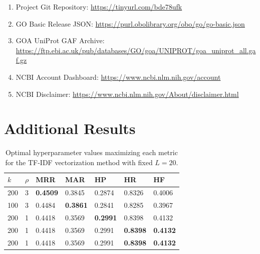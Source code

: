 \documentclass[11pt]{article}
\theoremstyle{plain}
\theoremstyle{definition}
\begin{document}
\begin{enumerate}
    \item Project Git Repository: \url{https://tinyurl.com/bde78ufk}
    \item GO Basic Release JSON\@: \url{https://purl.obolibrary.org/obo/go/go-basic.json}
    \item GOA UniProt GAF Archive: \url{https://ftp.ebi.ac.uk/pub/databases/GO/goa/UNIPROT/goa_uniprot_all.gaf.gz}
    \item NCBI Account Dashboard: \url{https://www.ncbi.nlm.nih.gov/account}
    \item NCBI Disclaimer: \url{https://www.ncbi.nlm.nih.gov/About/disclaimer.html}
\end{enumerate}

\section{Additional Results}\label{sec:appendix-data}

\begin{table}[H]
    \centering
    \begin{tabular}{| m{2em} | m{2em} | m{4em} | m{4em} | m{4em} | m{4em} | m{4em} |}
        \hline
        $k$ & $\rho$ & MRR             & MAR             & HP              & HR              & HF              \\
        \hline
        \hline
        200 & 3      & \textbf{0.4509} & 0.3845          & 0.2874          & 0.8326          & 0.4006          \\
        \hline
        100 & 3      & 0.4484          & \textbf{0.3861} & 0.2841          & 0.8285          & 0.3967          \\
        \hline
        200 & 1      & 0.4418          & 0.3569          & \textbf{0.2991} & 0.8398          & 0.4132          \\
        \hline
        200 & 1      & 0.4418          & 0.3569          & 0.2991          & \textbf{0.8398} & \textbf{0.4132} \\
        \hline
        200 & 1      & 0.4418          & 0.3569          & 0.2991          & \textbf{0.8398} & \textbf{0.4132} \\
        \hline
    \end{tabular}
    \caption{Optimal hyperparameter values maximizing each metric for the TF-IDF vectorization method with fixed $L=20$.}\label{tab:tfidf_optimal}
\end{table}
\end{document}
